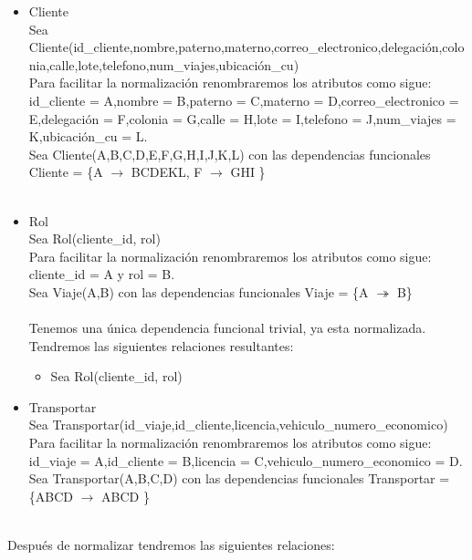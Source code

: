 \documentclass{article}
\begin{document}
\begin{itemize}
\item Cliente\\
Sea Cliente(id_cliente,nombre,paterno,materno,correo\_electronico,delegación,colonia,calle,lote,telefono,num\_viajes,ubicación\_cu)\\
Para facilitar la normalización renombraremos los atributos como sigue:
id_cliente = A,nombre = B,paterno = C,materno = D,correo\_electronico = E,delegación = F,colonia = G,calle = H,lote = I,telefono = J,num\_viajes = K,ubicación\_cu = L.\\
Sea Cliente(A,B,C,D,E,F,G,H,I,J,K,L) con las dependencias funcionales
Cliente = \{A $\rightarrow$ BCDEKL, F $\rightarrow$ GHI  \} \\
\\

\item Rol\\
Sea Rol(cliente\_id, rol)\\
Para facilitar la normalización renombraremos los atributos como sigue:
cliente\_id = A y rol = B.\\
Sea Viaje(A,B) con las dependencias funcionales
Viaje = \{A $\twoheadrightarrow$ B\} \\
\\
Tenemos una única dependencia funcional trivial, ya esta normalizada.
Tendremos las siguientes relaciones resultantes:
\begin{itemize}
\item Sea Rol(cliente\_id, rol)\\
\end{itemize}

\item Transportar\\
Sea Transportar(id\_viaje,id\_cliente,licencia,vehiculo\_numero\_economico)\\
Para facilitar la normalización renombraremos los atributos como sigue:
id\_viaje = A,id\_cliente = B,licencia = C,vehiculo\_numero\_economico = D.\\
Sea Transportar(A,B,C,D) con las dependencias funcionales
Transportar = \{ABCD $\rightarrow$ ABCD \} \\
\\


\end{itemize}
Después de normalizar tendremos las siguientes relaciones:
\end{document}
